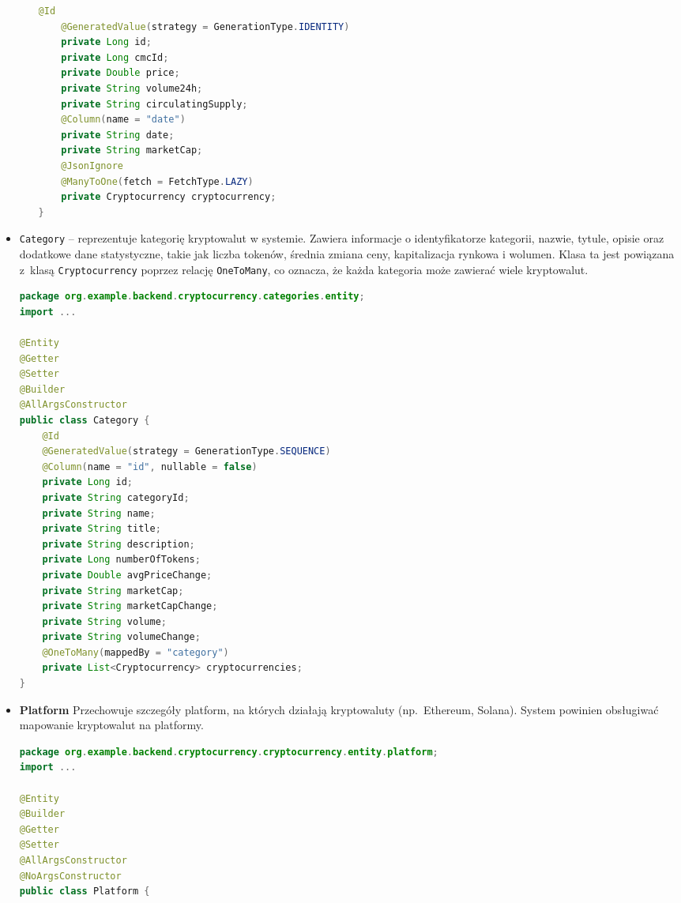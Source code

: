 \begin{itemize}
\begin{itemize}
\begin{lstlisting}[language=Java, style=JavaStyle]
	@Id
	@GeneratedValue(strategy = GenerationType.IDENTITY)
	private Long id;
	private Long cmcId;
	private Double price;
	private String volume24h;
	private String circulatingSupply;
	@Column(name = "date")
	private String date;
	private String marketCap;
	@JsonIgnore
	@ManyToOne(fetch = FetchType.LAZY)
	private Cryptocurrency cryptocurrency;
}
\end{lstlisting}
\end{itemize}
	\item \texttt{Category} -- reprezentuje kategorię kryptowalut w systemie. Zawiera informacje o identyfikatorze kategorii, nazwie, tytule, opisie oraz dodatkowe dane statystyczne, takie jak liczba tokenów, średnia zmiana ceny, kapitalizacja rynkowa i wolumen. Klasa ta jest powiązana z~klasą \texttt{Cryptocurrency} poprzez relację \texttt{OneToMany}, co oznacza, że każda kategoria może zawierać wiele kryptowalut. 
\begin{lstlisting}[language=Java, style=JavaStyle]
package org.example.backend.cryptocurrency.categories.entity;
import ...

@Entity
@Getter
@Setter
@Builder
@AllArgsConstructor
public class Category {
	@Id
	@GeneratedValue(strategy = GenerationType.SEQUENCE)
	@Column(name = "id", nullable = false)
	private Long id;
	private String categoryId;
	private String name;
	private String title;
	private String description;
	private Long numberOfTokens;
	private Double avgPriceChange;
	private String marketCap;
	private String marketCapChange;
	private String volume;
	private String volumeChange;
	@OneToMany(mappedBy = "category")
	private List<Cryptocurrency> cryptocurrencies;
}

\end{lstlisting}
\item \textbf{Platform} Przechowuje szczegóły platform, na których działają kryptowaluty (np.\ Ethereum, Solana). System powinien obsługiwać mapowanie kryptowalut na platformy.
\begin{lstlisting}[language=Java, style=JavaStyle]
package org.example.backend.cryptocurrency.cryptocurrency.entity.platform;
import ...

@Entity
@Builder
@Getter
@Setter
@AllArgsConstructor
@NoArgsConstructor
public class Platform {


\end{lstlisting}
\end{itemize}
